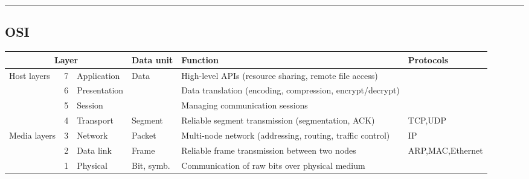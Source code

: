\documentclass{form}
\begin{document}
\vspace{0.5em}\noindent\rule{\textwidth}{1.0pt}

\noindent
\begin{minipage}{0.052\textwidth}
    \subsection*{OSI}
\end{minipage}%
\begin{minipage}{0.948\textwidth}
    \begin{tabular}{@{}p{9mm} | l | l | l | l | l@{}}
        \multicolumn{3}{c|}{\textbf{Layer}}                    & Data unit                & Function                                                        & Protocols          \\ \hline
        \multirow{4}{9mm}{Host layers}      & 7 & Application  & \multirow{3}{*}{Data}    & High-level APIs (resource sharing, remote file access)          &                    \\ \cline{2-3} \cline{5-6}
                                            & 6 & Presentation &                          & Data translation (encoding, compression, encrypt/decrypt)       &                    \\ \cline{2-3} \cline{5-6}
                                            & 5 & Session      &                          & Managing communication sessions                                 &                    \\ \cline{2-6}
                                            & 4 & Transport    & Segment                  & Reliable segment transmission (segmentation, ACK)               & TCP,UDP            \\ \hline
        \multirow{3}{9mm}{Media layers}     & 3 & Network      & Packet                   & Multi-node network (addressing, routing, traffic control)       & IP                 \\ \cline{2-6}
                                            & 2 & Data link    & Frame                    & Reliable frame transmission between two nodes                   & ARP,MAC,Ethernet   \\ \cline{2-6}
                                            & 1 & Physical     & Bit, symb.               & Communication of raw bits over physical medium                  &                    \\
    \end{tabular}
\end{minipage}%
\end{document}
